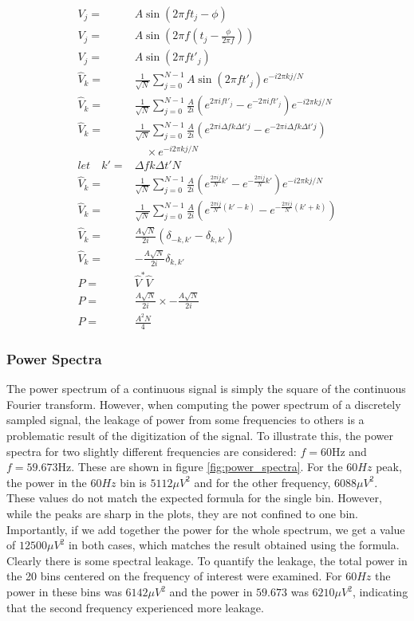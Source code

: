 \documentclass[twocolumn]{article}
\begin{document}
\begin{equation}
\begin{split}
  V_j =& A \sin(2 \pi f t_j - \phi) \\
  V_j =& A \sin(2 \pi f (t_j -\frac{\phi}{2\pi f})) \\
  V_j =& A \sin(2 \pi f t'_j) \\
  \hat{V}_k =& \frac{1}{\sqrt{N}}\sum_{j=0}^{N-1} A\sin(2 \pi f t'_j) e^{-i2\pi kj/N} \\
  \hat{V}_k =& \frac{1}{\sqrt{N}}\sum_{j=0}^{N-1} \frac{A}{2i} (e^{2 \pi if t'_j} - e^{-2 \pi if t'_j}) e^{-i2\pi kj/N} \\
  \hat{V}_k =& \frac{1}{\sqrt{N}}\sum_{j=0}^{N-1} \frac{A}{2i} (e^{2 \pi i\Delta f k \Delta t' j} - e^{-2 \pi i\Delta f k \Delta t' j})\\
  & \quad \times e^{-i2\pi kj/N} \\
  let \quad k' =& \Delta f k \Delta t'N \\
  \hat{V}_k =& \frac{1}{\sqrt{N}}\sum_{j=0}^{N-1} \frac{A}{2i} (e^{\frac{2 \pi ij}{N} k'} - e^{-\frac{2 \pi ij}{N} k'}) e^{-i2\pi kj/N} \\
  \hat{V}_k =& \frac{1}{\sqrt{N}}\sum_{j=0}^{N-1} \frac{A}{2i} (e^{\frac{2 \pi ij}{N} (k' - k)} - e^{-\frac{2 \pi ij}{N} (k' + k)}) \\
  \hat{V}_k =& \frac{A\sqrt{N}}{2i} (\delta_{-k, k'} - \delta_{k,k'}) \\
  \hat{V}_k =& -\frac{A\sqrt{N}}{2i} \delta_{k,k'} \\
  P =& \hat{V}^* \hat{V} \\
  P =& \frac{A\sqrt{N}}{2i}\times -\frac{A\sqrt{N}}{2i} \\
  P =& \frac{A^2 N}{4}
\end{split}
\label{eq:power}
\end{equation}

\subsubsection{Power Spectra}
The power spectrum of a continuous signal is simply the square of the continuous
Fourier transform. However, when computing the power spectrum of a discretely
sampled signal, the leakage of power from some frequencies to others is a
problematic result of the digitization of the signal. To illustrate this, the
power spectra for two slightly different frequencies are considered: $f = 60$Hz
and $f = 59.673$Hz. These are shown in figure \ref{fig:power_spectra}. For the $60Hz$ peak, the power in the $60Hz$ bin is $5112\mu V^2$ and for the other frequency, $6088\mu V^2$. These values do not match the expected formula for the single bin. However, while the peaks are sharp in the plots, they are not confined to one bin. Importantly, if we add together the power for the whole spectrum, we get a value of $12500 \mu V^2$ in both cases, which matches the result obtained using the formula. Clearly there is some spectral leakage. To quantify the leakage, the total power in the 20 bins centered on the frequency of interest were examined. For $60Hz$ the power in these bins was $6142 \mu V^2$ and the power in $59.673$ was $6210\mu V^2$, indicating that the second frequency experienced more leakage.
\end{document}
